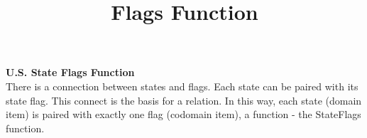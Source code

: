 \documentclass{ximera}
\title{Flags Function}
\begin{document}
\begin{abstract}
\end{abstract}

\maketitle




\textbf{U.S. State Flags Function} \\

There is a connection between states and flags.  Each state can be paired with its state flag.  This connect is the basis for a relation.
In this way, each state (domain item) is paired with exactly one flag (codomain item), a function - the StateFlags function.
\end{document}
